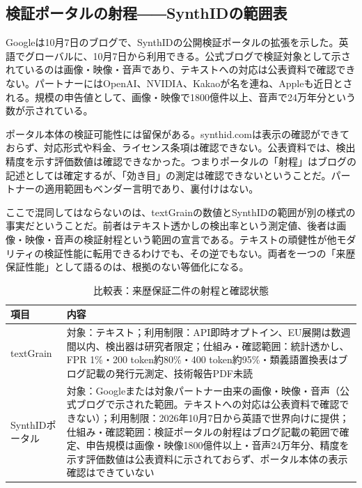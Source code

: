 \subsection*{検証ポータルの射程――SynthIDの範囲表}

Googleは10月7日のブログで、SynthIDの公開検証ポータルの拡張を示した。英語でグローバルに、10月7日から利用できる。公式ブログで検証対象として示されているのは画像・映像・音声であり、テキストへの対応は公表資料で確認できない。パートナーにはOpenAI、NVIDIA、Kakaoが名を連ね、Appleも近日とされる。規模の申告値として、画像・映像で1800億件以上、音声で24万年分という数が示されている。\cite{synthid}

ポータル本体の検証可能性には留保がある。synthid.comは表示の確認ができておらず、対応形式や料金、ライセンス条項は確認できない。公表資料では、検出精度を示す評価数値は確認できなかった。つまりポータルの「射程」はブログの記述としては確定するが、「効き目」の測定は確認できないということだ。パートナーの適用範囲もベンダー言明であり、裏付けはない。\cite{synthid}

ここで混同してはならないのは、textGrainの数値とSynthIDの範囲が別の様式の事実だということだ。前者はテキスト透かしの検出率という測定値、後者は画像・映像・音声の検証射程という範囲の宣言である。テキストの頑健性が他モダリティの検証性能に転用できるわけでも、その逆でもない。両者を一つの「来歴保証性能」として語るのは、根拠のない等価化になる。\cite{textgrain}\cite{synthid}

\begin{table}[htbp]
\centering\footnotesize
\begin{tabularx}{0.98\linewidth}{@{}lX@{}}
\toprule
項目 & 内容 \\
\midrule
textGrain & 対象：テキスト；利用制限：API即時オプトイン、EU展開は数週間以内、検出器は研究者限定；仕組み・確認範囲：統計透かし、FPR 1\%・200 token約80\%・400 token約95\%・類義語置換表はブログ記載の発行元測定、技術報告PDF未読 \\
SynthIDポータル & 対象：Googleまたは対象パートナー由来の画像・映像・音声（公式ブログで示された範囲。テキストへの対応は公表資料で確認できない）；利用制限：2026年10月7日から英語で世界向けに提供；仕組み・確認範囲：検証ポータルの射程はブログ記載の範囲で確定、申告規模は画像・映像1800億件以上・音声24万年分、精度を示す評価数値は公表資料に示されておらず、ポータル本体の表示確認はできていない \\
\bottomrule
\end{tabularx}
\caption{比較表：来歴保証二件の射程と確認状態}
\end{table}
\noindent \cite{textgrain}\cite{synthid}

